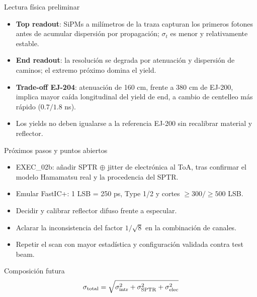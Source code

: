 \documentclass[aspectratio=169]{beamer}
\begin{document}
\begin{frame}{Lectura física preliminar}
  \begin{itemize}
    \item \textbf{Top readout}: SiPMs a milímetros de la traza capturan los primeros
      fotones antes de acumular dispersión por propagación; $\sigma_t$ es menor y
      relativamente estable.
    \item \textbf{End readout}: la resolución se degrada por atenuación y dispersión
      de caminos; el extremo próximo domina el yield.
    \item \textbf{Trade-off EJ-204}: atenuación de 160 cm, frente a 380 cm de EJ-200,
      implica mayor caída longitudinal del yield de end, a cambio de centelleo más
      rápido ($0.7/1.8$ ns).
    \item Los yields no deben igualarse a la referencia EJ-200 sin recalibrar material
      y reflector.
  \end{itemize}
\end{frame}

\begin{frame}{Próximos pasos y puntos abiertos}
  \begin{itemize}
    \item EXEC\_02b: añadir SPTR $\oplus$ jitter de electrónica al ToA, tras confirmar
      el modelo Hamamatsu real y la procedencia del SPTR.
    \item Emular FastIC+: 1 LSB = 250 ps, Type 1/2 y cortes $\geq300/\geq500$ LSB.
    \item Decidir y calibrar reflector difuso frente a especular.
    \item Aclarar la inconsistencia del factor $1/\sqrt{8}$ en la combinación de canales.
    \item Repetir el scan con mayor estadística y configuración validada contra test beam.
  \end{itemize}
  \begin{block}{Composición futura}
    \[
      \sigma_{\rm total} =
      \sqrt{\sigma_{\rm intr}^2+\sigma_{\rm SPTR}^2+\sigma_{\rm elec}^2}
    \]
  \end{block}
\end{frame}
\end{document}
